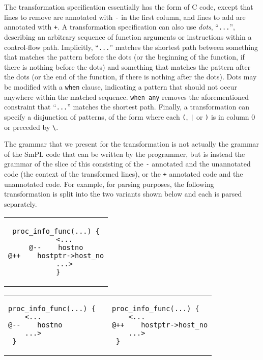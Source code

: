 The transformation specification essentially has the form of C code, except
that lines to remove are annotated with \verb+-+ in the first column, and
lines to add are annotated with \verb-+-.  A transformation specification
can also use {\em dots}, ``\verb-...-'', describing an arbitrary sequence
of function arguments or instructions within a control-flow path.
Implicitly, ``\verb-...-'' matches the shortest path between something that
matches the pattern before the dots (or the beginning of the function, if
there is nothing before the dots) and something that matches the pattern
after the dots (or the end of the function, if there is nothing after the
dots).  Dots may be modified with a {\tt when} clause, indicating a pattern
that should not occur anywhere within the matched sequence.  {\tt when any}
removes the aforementioned constraint that ``\verb-...-'' matches the
shortest path.  Finally, a transformation can specify a disjunction of
patterns, of the form  where each \texttt{(}, \texttt{|} or \texttt{)} is
in column 0 or preceded by \texttt{\textbackslash}.

The grammar that we present for the transformation is not actually the
grammar of the SmPL code that can be written by the programmer, but is
instead the grammar of the slice of this consisting of the {\tt -}
annotated and the unannotated code (the context of the transformed lines),
or the {\tt +} annotated code and the unannotated code.  For example, for
parsing purposes, the following transformation
is split into the two variants shown below and each is parsed
separately.

\begin{center}
\begin{tabular}{c}
\begin{lstlisting}[language=Cocci]
  proc_info_func(...) {
    <...
@--    hostno
@++    hostptr->host_no
    ...>
 }
\end{lstlisting}\\
\end{tabular}
\end{center}

{%
\begin{center}
\begin{tabular}{p{5cm}p{3cm}p{5cm}}
\begin{lstlisting}[language=Cocci]
  proc_info_func(...) {
    <...
@--    hostno
    ...>
 }
\end{lstlisting}
&&
\begin{lstlisting}[language=Cocci]
  proc_info_func(...) {
    <...
@++    hostptr->host_no
    ...>
 }
\end{lstlisting}
\end{tabular}
\end{center}
}

